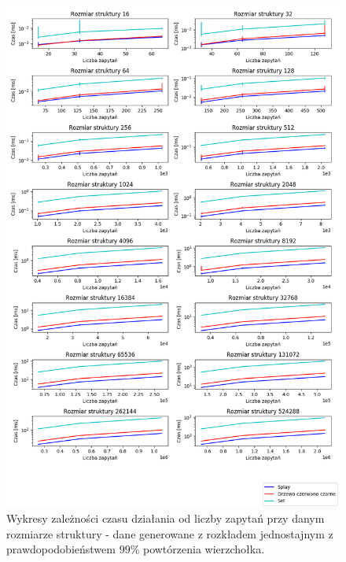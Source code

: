 \documentclass[declaration,shortabstract]{iithesis}
\theoremstyle{thm}
\theoremstyle{remark}
\theoremstyle{plain}
\theoremstyle{plain}
\theoremstyle{plain}
\begin{document}
\begin{figure}[H]  
\centering
    \includegraphics[scale=0.45]{wykresy3/uniform1.png}
      \caption{Wykresy zależności czasu działania od liczby zapytań przy danym rozmiarze struktury - dane generowane z rozkładem jednostajnym z prawdopodobieństwem  \(99\%\) powtórzenia wierzchołka. }  
\end{figure}
\end{document}
